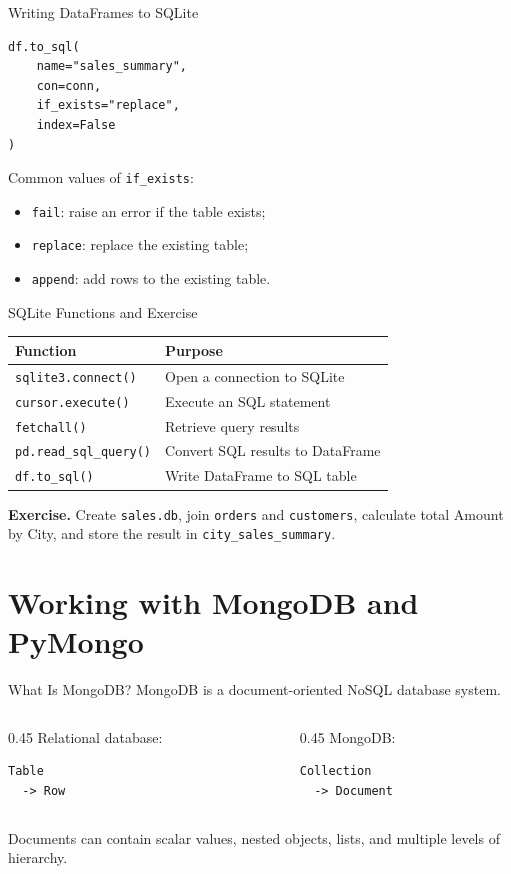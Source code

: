 \documentclass[aspectratio=169,11pt]{beamer}
\newcommand{\code}[1]{\texttt{#1}}
\newcommand{\smallgap}{\vspace{0.4em}}
\begin{document}
\begin{frame}[fragile]{Writing DataFrames to SQLite}
\begin{lstlisting}[style=pythonstyle]
df.to_sql(
    name="sales_summary",
    con=conn,
    if_exists="replace",
    index=False
)
\end{lstlisting}

Common values of \code{if\_exists}:
\begin{itemize}
  \item \code{fail}: raise an error if the table exists;
  \item \code{replace}: replace the existing table;
  \item \code{append}: add rows to the existing table.
\end{itemize}
\end{frame}

\begin{frame}{SQLite Functions and Exercise}
\begin{tabularx}{\textwidth}{lX}
\toprule
\textbf{Function} & \textbf{Purpose} \\
\midrule
\code{sqlite3.connect()} & Open a connection to SQLite \\
\code{cursor.execute()} & Execute an SQL statement \\
\code{fetchall()} & Retrieve query results \\
\code{pd.read\_sql\_query()} & Convert SQL results to DataFrame \\
\code{df.to\_sql()} & Write DataFrame to SQL table \\
\bottomrule
\end{tabularx}

\smallgap
\textbf{Exercise.} Create \code{sales.db}, join \code{orders} and \code{customers}, calculate total Amount by City, and store the result in \code{city\_sales\_summary}.
\end{frame}

\section{Working with MongoDB and PyMongo}

\begin{frame}[fragile]{What Is MongoDB?}
MongoDB is a document-oriented NoSQL database system.

\begin{columns}[T]
\begin{column}{0.45\textwidth}
Relational database:
\begin{lstlisting}[style=textstyle]
Table
  -> Row
\end{lstlisting}
\end{column}
\begin{column}{0.45\textwidth}
MongoDB:
\begin{lstlisting}[style=textstyle]
Collection
  -> Document
\end{lstlisting}
\end{column}
\end{columns}

\smallgap
Documents can contain scalar values, nested objects, lists, and multiple levels of hierarchy.
\end{frame}
\end{document}
